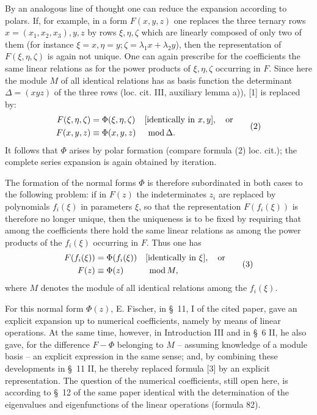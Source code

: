 \documentclass[11pt]{article}
\newcommand{\modu}[1]{\;\operatorname{mod} #1}
\providecommand{\modu}[1]{\;\operatorname{mod} #1}
\begin{document}
By an analogous line of thought one can reduce the expansion according to polars. If, for example, in a form $F(x,y,z)$ one replaces the three ternary rows $x=(x_1,x_2,x_3),y,z$ by rows $\xi,\eta,\zeta$ which are linearly composed of only two of them (for instance $\xi=x,\eta=y;\zeta=\lambda_1x+\lambda_2y$), then the representation of $F(\xi,\eta,\zeta)$ is again not unique. One can again prescribe for the coefficients the same linear relations as for the power products of $\xi,\eta,\zeta$ occurring in $F$. Since here the module $M$ of all identical relations has as basis function the determinant $\Delta=(xyz)$ of the three rows (loc. cit. III, auxiliary lemma a)), [1] is replaced by:
\begin{equation}
\begin{aligned}
        F(\xi,\eta,\zeta)&=\Phi(\xi,\eta,\zeta)&&[\text{identically in }x,y],\quad\text{or}\notag\\
        F(x,y,z)&\equiv\Phi(x,y,z)&&\modu{\Delta}.
\end{aligned}
\tag{2}
\end{equation}
It follows that $\Phi$ arises by polar formation (compare formula (2) loc. cit.); the complete series expansion is again obtained by iteration.

The formation of the normal forms $\Phi$ is therefore subordinated in both cases to the following problem: if in $F(z)$ the indeterminates $z_i$ are replaced by polynomials $f_i(\xi)$ in parameters $\xi$, so that the representation $F(f_i(\xi))$ is therefore no longer unique, then the uniqueness is to be fixed by requiring that among the coefficients there hold the same linear relations as among the power products of the $f_i(\xi)$ occurring in $F$. Thus one has
\begin{equation}
\begin{aligned}
        F(f_i(\xi))&=\Phi(f_i(\xi))&&[\text{identically in }\xi],\quad\text{or}\notag\\
        F(z)&\equiv\Phi(z)&&\modu{M},
\end{aligned}
\tag{3}
\end{equation}
where $M$ denotes the module of all identical relations among the $f_i(\xi)$.

For this normal form $\Phi(z)$, E. Fischer, in \S~11, I of the cited paper, gave an explicit expansion up to numerical coefficients, namely by means of linear operations. At the same time, however, in Introduction III and in \S~6 II, he also gave, for the difference $F-\Phi$ belonging to $M$ -- assuming knowledge of a module basis -- an explicit expression in the same sense; and, by combining these developments in \S~11 II, he thereby replaced formula [3] by an explicit representation. The question of the numerical coefficients, still open here, is according to \S~12 of the same paper identical with the determination of the eigenvalues and eigenfunctions of the linear operations (formula 82).
\end{document}
